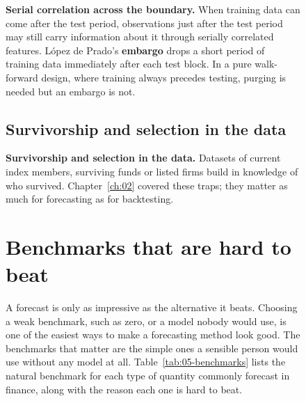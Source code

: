\begin{figure}[htbp]
\textbf{Serial correlation across the boundary.} When training data can come after the test period, observations just after the test period may still carry information about it through serially correlated features. L\'opez de Prado's \textbf{embargo} drops a short period of training data immediately after each test block. In a pure walk-forward design, where training always precedes testing, purging is needed but an embargo is not.

\subsection{Survivorship and selection in the data} 

\textbf{Survivorship and selection in the data.} 
Datasets of current index members, surviving funds or listed firms build in knowledge of who survived. Chapter~\ref{ch:02} covered these traps; they matter as much for forecasting as for backtesting.

\section{Benchmarks that are hard to beat}
\label{sec:05-benchmarks}

A forecast is only as impressive as the alternative it beats. Choosing a weak benchmark, such as zero, or a model nobody would use, is one of the easiest ways to make a forecasting method look good. The benchmarks that matter are the simple ones a sensible person would use without any model at all. Table~\ref{tab:05-benchmarks} lists the natural benchmark for each type of quantity commonly forecast in finance, along with the reason each one is hard to beat.


\end{figure}
